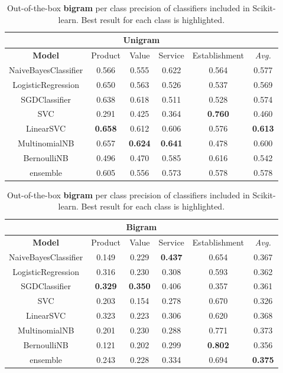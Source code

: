 \documentclass[a4paper,11pt]{kth-mag}
\begin{document}
\begin{table}[h]
  \centering
  \begin{tabular}{| c | c | c | c | c || c |}
    \hline
    \multicolumn{6}{|c|}{Unigram} \\
    \hline
    \textbf{Model} & Product & Value & Service & Establishment & \emph{Avg.} \\ \hline
    NaiveBayesClassifier& 0.566 & 0.555 & 0.622 & 0.564 & 0.577 \\
    LogisticRegression  & 0.650 & 0.563 & 0.526 & 0.537 & 0.569 \\
    SGDClassifier       & 0.638 & 0.618 & 0.511 & 0.528 & 0.574 \\
    SVC                 & 0.291 & 0.425 & 0.364 & \textbf{0.760} & 0.460 \\
    LinearSVC           & \textbf{0.658} & 0.612 & 0.606 & 0.576 & \textbf{0.613} \\
    MultinomialNB       & 0.657 & \textbf{0.624} & \textbf{0.641} & 0.478 & 0.600 \\
    BernoulliNB         & 0.496 & 0.470 & 0.585 & 0.616 & 0.542 \\
    \hline
    ensemble            & 0.605 & 0.556 & 0.573 & 0.578 & 0.578 \\
    \hline
  \end{tabular}
  \caption{Out-of-the-box \textbf{unigram} per class precision of classifiers included in Scikit-learn.
    Best result for each class is highlighted.
  }
  \label{tab:individual_unigram_accuracy}

  \begin{tabular}{| c | c | c | c | c || c |}
    \hline
    \multicolumn{6}{|c|}{Bigram} \\
    \hline
    \textbf{Model} & Product & Value & Service & Establishment & \emph{Avg.} \\ \hline
    NaiveBayesClassifier& 0.149 & 0.229 & \textbf{0.437} & 0.654 & 0.367 \\
    LogisticRegression  & 0.316 & 0.230 & 0.308 & 0.593 & 0.362 \\
    SGDClassifier       & \textbf{0.329} & \textbf{0.350} & 0.406 & 0.357 & 0.361 \\
    SVC                 & 0.203 & 0.154 & 0.278 & 0.670 & 0.326 \\
    LinearSVC           & 0.323 & 0.223 & 0.306 & 0.620 & 0.368 \\
    MultinomialNB       & 0.201 & 0.230 & 0.288 & 0.771 & 0.373 \\
    BernoulliNB         & 0.121 & 0.202 & 0.299 & \textbf{0.802} & 0.356 \\
    \hline
    ensemble            & 0.243 & 0.228 & 0.334 & 0.694 & \textbf{0.375}\\
    \hline
  \end{tabular}
  \caption{Out-of-the-box \textbf{bigram} per class precision of classifiers
    included in Scikit-learn. Best result for each class is highlighted.
  }
  \label{tab:individual_bigram_accuracy}
\end{table}
\end{document}
